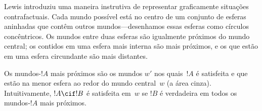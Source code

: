 \documentclass[../../../include/open-logic-section]{subfiles}
\begin{document}
Lewis introduziu uma maneira instrutiva de representar graficamente situações
contrafactuais. Cada mundo possível está no centro de um conjunto
de esferas aninhadas que contêm outros mundos---desenhamos essas esferas como
círculos concêntricos. Os mundos entre duas esferas são igualmente próximos
do mundo central; os contidos em uma esfera mais interna são mais próximos,
e os que estão em uma esfera circundante são mais distantes.
\begin{center}
\end{center}
Os mundos-$!A$ mais próximos são os mundos $w'$ nos quais~$!A$ é satisfeita
e que estão na menor esfera ao redor do mundo central~$w$ (a área
cinza). Intuitivamente, $!A \cif !B$ é satisfeita em~$w$ se $!B$ é verdadeira
em todos os mundos-$!A$ mais próximos.
\end{document}
